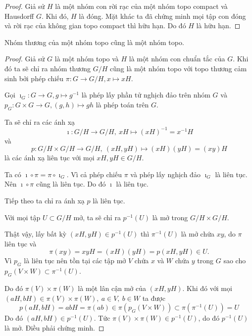 \begin{proof}
    Giả sử $H$ là một nhóm con rời rạc của một nhóm topo compact và Hausdorff $G$. Khi đó, $H$ là đóng. Mặt khác ta đã chứng minh mọi tập con đóng và rời rạc của không gian topo compact thì hữu hạn. Do đó $H$ là hữu hạn.
\end{proof}
\begin{thm}\label{thm 1.1.13}
    Nhóm thương của một nhóm topo cũng là một nhóm topo. 
\end{thm}
\begin{proof}
    Giả sử $G$ là một nhóm topo và $H$ là một nhóm con chuẩn tắc của $G$. Khi đó ta sẽ chỉ ra nhóm thương $G/H$ cũng là một nhóm topo với topo thương cảm sinh bởi phép chiếu $\pi: G \to G/H, x\mapsto xH$.
    
    Gọi $\imath_G: G \to G, g\mapsto g^{-1}$ là phép lấy phần tử nghịch đảo trên nhóm $G$ và $p_G: G\times G \to G, (g,h)\mapsto gh$ là phép toán trên $G$.
    
    Ta sẽ chỉ ra các ánh xạ 
    \[\imath: G/H \to G/H,~xH \mapsto (xH)^{-1} = x^{-1}H\] và \[p: G/H \times G/H \to G/H,~(xH,yH)\mapsto (xH)(yH) = (xy)H\] là các ánh xạ liên tục với mọi $xH, yH \in G/H$.

    
    Ta có $\imath \circ \pi = \pi \circ \imath_G$. Vì cả phép chiếu $\pi$ và phép lấy nghịch đảo $\imath_G$ là liên tục. Nên $\imath \circ \pi$ cũng là liên tục. Do đó $\imath$ là liên tục.

    Tiếp theo ta chỉ ra ánh xạ $p$ là liên tục.
    
    Với mọi tập $U \subset G/H$ mở, ta sẽ chỉ ra $p^{-1}(U)$ là mở trong $G/H \times G/H$. 
    
    Thật vậy, lấy bất kỳ $(xH,yH) \in p^{-1}(U)$ thì $\pi^{-1}(U)$ là mở chứa $xy$, do $\pi$ liên tục và \[\pi(xy) = xyH = (xH)(yH) = p(xH,yH) \in U.\] 
    Vì $p_G$ là liên tục nên tồn tại các tập mở $V $ chứa $x$ và $W$ chứa $y$ trong $G$ sao cho $p_G(V \times W) \subset \pi^{-1}(U)$.

    Do đó $\pi(V) \times \pi(W)$ là một lân cận mở của $(xH,yH)$. 
    Khi đó với mọi $(aH,bH) \in \pi(V) \times \pi(W),~a\in V,~b\in W$ ta được
    \[p(aH,bH) = abH = \pi(ab) \in \pi(p_G(V\times W))\subset \pi(\pi^{-1}(U)) = U\]
    Do đó $(aH,bH) \in p^{-1}(U)$. Tức $\pi(V) \times \pi(W) \in p^{-1}(U)$, do đó $p^{-1}(U)$ là mở. Điều phải chứng minh.
\end{proof}